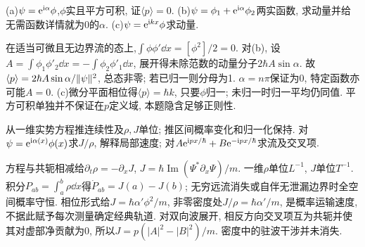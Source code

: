 \begin{exercise}
(a)$\psi=\mathrm e^{\mathrm i\alpha}\phi$,$\phi$实且平方可积, 证$\langle p\rangle=0$. (b)$\psi=\phi_1+\mathrm e^{\mathrm i\alpha}\phi_2$两实函数, 求动量并给无需函数详情就为0的$\alpha$. (c)$\psi=\mathrm e^{\mathrm i kx}\phi$求动量.
\end{exercise}
\begin{solution}
在适当可微且无边界流的态上,$\int\phi\phi'\dd x=[\phi^2]/2=0$. 对(b), 设$A=\int\phi_1\phi'_2\dd x=-\int\phi_2\phi'_1\dd x$, 展开得未除范数的动量分子$2\hbar A\sin\alpha$. 故$\langle p\rangle=2\hbar A\sin\alpha/\lVert \psi\rVert^2$, 总态非零; 若已归一则分母为1. $\alpha=n\pi$保证为0, 特定函数亦可能$A=0$. (c)微分平面相位得$\langle p\rangle=\hbar k$, 只要$\phi$归一; 未归一时归一平均仍同值. 平方可积单独并不保证在$p$定义域, 本题隐含足够正则性.
\end{solution}
\begin{exercise}
从一维实势方程推连续性及$\rho,J$单位; 推区间概率变化和归一化保持. 对$\psi=\mathrm e^{\mathrm i\alpha(x)}\phi(x)$求$J/\rho$, 解释局部速度; 对$A\mathrm e^{\mathrm i px/\hbar}+B\mathrm e^{-\mathrm i px/\hbar}$求流及交叉项.
\end{exercise}
\begin{solution}
方程与共轭相减给$\partial_t\rho=-\partial_xJ$, $J=\hbar\operatorname{Im}(\Psi^*\partial_x\Psi)/m$. 一维$\rho$单位$L^{-1}$, $J$单位$T^{-1}$. 积分$P_{ab}=\int_a^b\rho\dd x$得$\dot P_{ab}=J(a)-J(b)$; 无穷远流消失或自伴无泄漏边界时全空间概率守恒. 相位形式给$J=\hbar\alpha'\phi^2/m$, 非零密度处$J/\rho=\hbar\alpha'/m$, 是概率运输速度, 不据此赋予每次测量确定经典轨道. 对双向波展开, 相反方向交叉项互为共轭并使其对虚部净贡献为0, 所以$J=p(|A|^2-|B|^2)/m$. 密度中的驻波干涉并未消失.
\end{solution}
